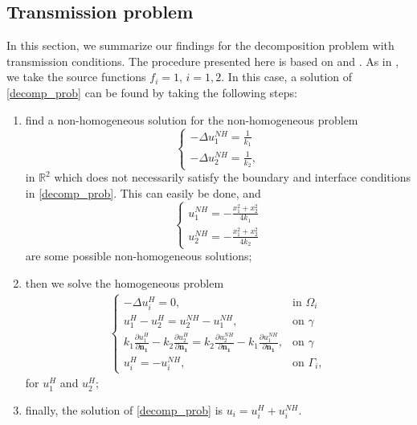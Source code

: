 \documentclass[5p,authoryear]{elsarticle}
\begin{document}
\subsection{Transmission problem}

In this section, we summarize our findings for the decomposition problem with transmission conditions. The procedure presented here is based on \cite{alves2005new} and \cite{alves2021domain}. As in \cite{gustafsson2019error}, we take the source functions \(f_i = 1, \, i=1, 2\). In this case, a solution of \eqref{decomp_prob} can be found by taking the following steps:
\begin{enumerate}
    \item \label{chapter_numerics_t_p_particular_prodecure} find a non-homogeneous solution for the non-homogeneous problem
    \[
        \begin{cases}
            -\Delta u_1^{NH} = \frac{1}{k_1}\\
            -\Delta u_2^{NH} = \frac{1}{k_2},
        \end{cases}
    \]
    in \(\mathbb{R}^2\) which does not necessarily satisfy the boundary and interface conditions in \eqref{decomp_prob}. This can easily be done, and
    \[
        \begin{cases}
            u_1^{NH} = -\frac{x_1^2 + x_2^2}{4k_1}\\
            u_2^{NH} = -\frac{x_1^2 + x_2^2}{4k_2}
        \end{cases}
    \]
    are some possible non-homogeneous solutions;
    \item then we solve the homogeneous problem
    \begin{align}\label{transmission_num_homo}
        \begin{cases}
        - \Delta u_i^H = 0, & \text{in }\Omega_i\\
        u_1^H - u_2^H = u_2^{NH}- u_1^{NH}, & \text{on }\gamma\\
        k_1 \frac{\partial u_1^H}{\partial \mathbf{n_1}} - k_2 \frac{\partial u_2^H}{\partial  \mathbf{n_1}} = k_2 \frac{\partial u_2^{NH}}{\partial  \mathbf{n_1}}  - k_1 \frac{\partial u_1^{NH}}{\partial  \mathbf{n_1}}, & \text{on }\gamma\\
        u_i^H = - u_i^{NH}, & \text{on }\Gamma_i,
        \end{cases}
    \end{align}
    for \(u_1^H\) and \(u_2^H\);
    \item finally, the solution of \eqref{decomp_prob} is \(u_i = u_i^H + u_i^{NH}\).
\end{enumerate}
\end{document}
